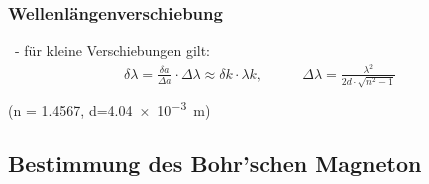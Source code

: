     \subsubsection{Wellenlängenverschiebung}
      \begin{myframe}{\subsecname\ - \subsubsecname}
        für kleine Verschiebungen gilt:
        \begin{align}
          \delta\lambda = \frac{\delta a}{\Delta a}\cdot \Delta\lambda\approx\delta k\cdot\lambda k,
          &\qquad\Delta\lambda = \frac{\lambda^2}{2d\cdot\sqrt{n^2-1}}\\
        \end{align}
        \scriptsize (n = \SI{1.4567}{}, d=\SI{4.04e-3}{m})
      \end{myframe}
  \subsection{Bestimmung des Bohr'schen Magneton}
